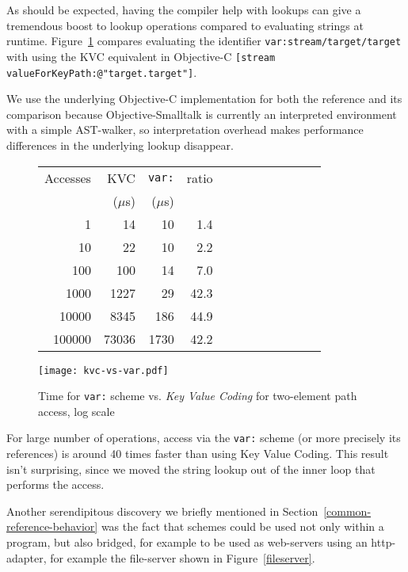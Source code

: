 \documentclass[preprint,authoryear]{llncs}
\begin{document}
As should be expected, having the compiler help with lookups can give a tremendous
boost to lookup operations compared to evaluating strings at runtime.  Figure~\ref{var-speed} 
compares evaluating the identifier {\tt var:stream/target/target} with using the  
KVC equivalent in Objective-C  {\tt [stream valueForKeyPath:@"target.target"]}.

We use the underlying Objective-C implementation for both the reference and its 
comparison because Objective-Smalltalk is currently an interpreted environment with
a simple AST-walker, so interpretation overhead makes performance differences in
the underlying lookup disappear.


\begin{figure}
  \centering
\begin{minipage}[c]{0.38\textwidth}
\begin{tabular}{|r|r|r|r|r|r|r|r|r|r|r|r|} \hline
Accesses  & KVC& {\tt var:}   & ratio	\\ 
 & ($\mu$s) & ($\mu$s) & \\ \hline
1 & 14 & 10 & 1.4   \\ %
10 & 22 & 10 &   2.2 \\   %
100 & 100 & 14 &  7.0\\   %
1000 & 1227 & 29 &  42.3  \\  %
10000 & 8345 & 186 &   44.9 \\   %
100000 & 73036 & 1730 &    42.2 \\ \hline
\end{tabular}
\end{minipage}
\begin{minipage}[c]{0.38\textwidth}
\texttt{[image: kvc-vs-var.pdf]}
\end{minipage}
\caption{Time for  {\tt var:} scheme vs. \emph{Key Value Coding} for two-element path access, log scale}
\label{var-speed}
\end{figure}

For large number of operations, access via the {\tt var:} scheme (or more precisely its references) is
around 40 times faster than using Key Value Coding.  This result isn't surprising, since we
moved the string lookup out of the inner loop that performs the access.

Another serendipitous discovery we briefly mentioned in Section~\ref{common-reference-behavior} was
the fact that schemes could be used not only within a program, but also bridged, for example to be used
as web-servers using an http-adapter, for example the file-server shown in Figure~\ref{fileserver}.
\end{document}

